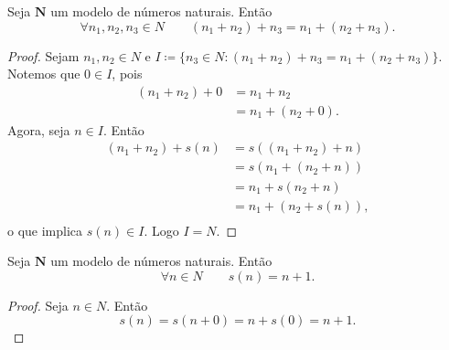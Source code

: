 \begin{teo} \label{conj.nat.ass}
	Seja $\bm N$ um modelo de números naturais. Então
	\begin{equation*}
	\forall n_1,n_2,n_3 \in N \qquad (n_1+n_2)+n_3 = n_1+(n_2+n_3).
	\end{equation*}
\end{teo}
\begin{proof}
	Sejam $n_1,n_2 \in N$ e $I \coloneqq \{n_3 \in N: (n_1+n_2)+n_3 = n_1+(n_2+n_3)\}$. Notemos que $0 \in I$, pois
	\begin{align*}
	(n_1+n_2)+0 &= n_1+n_2						\tag{A1} \\
	&= n_1+(n_2+0).										\tag{A1}
	\end{align*}
	Agora, seja $n \in I$. Então
	\begin{align*}
	(n_1+n_2)+s(n) &= s((n_1+n_2)+n)			\tag{A2} \\
	&= s(n_1+(n_2+n)) 									\tag{$n \in I$}\\
	&= n_1+s(n_2+n)										\tag{A2} \\
	&= n_1+(n_2+s(n)),									\tag{A2} \\
	\end{align*}
o que implica $s(n) \in I$. Logo $I=N$.
\end{proof}

\begin{teo} \label{conj.nat.suc}
	Seja $\bm N$ um modelo de números naturais. Então
	\begin{equation*}
	\forall n \in N \qquad s(n) = n+1.
	\end{equation*}
\end{teo}
\begin{proof}
	Seja $n \in N$. Então
	\begin{equation*}
	s(n) = s(n+0)=n+s(0)=n+1.
	\end{equation*}
\end{proof}

